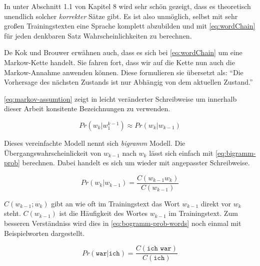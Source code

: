     In \parencite{nltk:book} unter Abschnitt 1.1 von Kapitel 8 wird sehr schön gezeigt, dass es theoretisch unendlich solcher \emph{korrekter} Sätze gibt. Es ist also unmöglich, selbst mit sehr großen Trainingstexten eine Sprache komplett abzubilden und mit \autoref{eq:wordChain} für jeden denkbaren Satz Wahrscheinlichkeiten zu berechnen.
    \newpage
        
    De Kok und Brouwer erwähnen auch, dass es sich bei \autoref{eq:wordChain} um eine Markow-Kette handelt. Sie fahren fort, dass wir auf die Kette nun auch die Markow-Annahme anwenden können. Diese formulieren sie übersetzt als: \enquote{Die Vorhersage des nächsten Zustands ist nur Abhängig von dem aktuellen Zustand.}\parencite[Abs.  3.8]{nlwp:book}
        
    \autoref{eq:markov-assumtion} zeigt \parencite[Abs.  3.8, Gleichung 3.8]{nlwp:book} in leicht veränderter Schreibweise um innerhalb dieser Arbeit konsitente Bezeichnungen zu verwenden.
        
    \begin{equation}
       	Pr(w_k|w_1^{k-1}) \approx Pr(w_k|w_{k-1})
       	\label{eq:markov-assumtion}
    \end{equation}
        
    Dieses vereinfachte Modell nennt sich \emph{bigramm} Modell. Die Übergangswahrscheinlickeit von \(w_{k-1}\) nach \(w_k\) lässt sich einfach mit \autoref{eq:bigramm-prob} berechnen. Dabei handelt es sich um \parencite[Abs.  3.8, Gleichung 3.9]{nlwp:book} wieder mit angepasster Schreibweise.
        
    \begin{equation}
       	Pr(w_k|w_{k-1}) = \frac{C(w_{k-1} w_k)}{C(w_{k-1})}
       	\label{eq:bigramm-prob}
    \end{equation}
    	
    \(C(w_{k-1};w_k)\) gibt an wie oft im Trainingstext das Wort \(w_{k-1}\) direkt vor \(w_k\) steht. \(C(w_{k-1})\) ist die Häufigkeit des Wortes \(w_{k-1}\) im Trainingstext. Zum besseren Verständniss wird dies in \autoref{eq:bogramm-prob-words} noch einmal mit Beispielworten dargestellt.
        
    \begin{equation}
       	Pr(\texttt{war}|\texttt{ich}) = \frac{C(\texttt{ich war})}{C(\texttt{ich})}
       	\label{eq:bogramm-prob-words}
    \end{equation}
        
